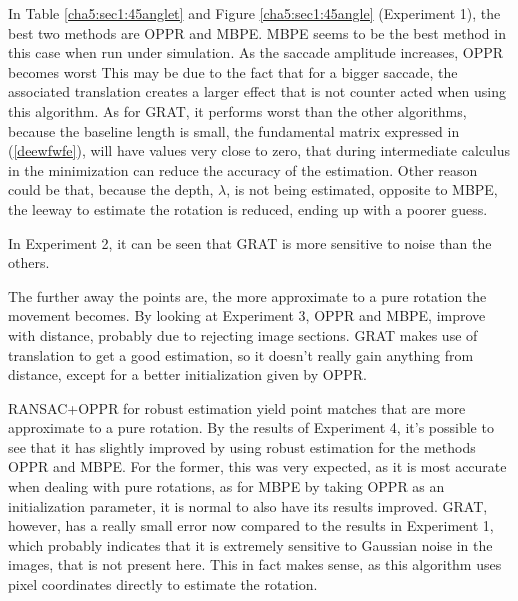 In Table \ref{cha5:sec1:45anglet} and Figure \ref{cha5:sec1:45angle} (Experiment 1), the best two methods are OPPR and MBPE. MBPE seems to be the best method in this case when run under simulation. As the saccade amplitude increases, OPPR becomes worst This may be due to the fact that for a bigger saccade, the associated translation creates a larger effect that is not counter acted when using this algorithm. As for GRAT, it performs worst than the other algorithms, because the baseline length is small, the fundamental matrix expressed in (\ref{deewfwfe}), will have values very close to zero, that during intermediate calculus in the minimization can reduce the accuracy of the estimation. Other reason could be that, because the depth, $\lambda$, is not being estimated, opposite to MBPE, the leeway to estimate the rotation is reduced, ending up with a poorer guess.

In Experiment 2, it can be seen that GRAT is more sensitive to noise than the others.

The further away the points are, the more approximate to a pure rotation the movement becomes. By looking at Experiment 3, OPPR and MBPE, improve with distance, probably due to rejecting image sections. GRAT makes use of translation to get a good estimation, so it doesn't really gain anything from distance, except for a better initialization given by OPPR.

RANSAC+OPPR for robust estimation yield point matches that are more approximate to a pure rotation. By the results of Experiment 4, it's possible to see that it has slightly improved by using robust estimation for the methods OPPR and MBPE. For the former, this was very expected, as it is most accurate when dealing with pure rotations, as for MBPE by taking OPPR as an initialization parameter, it is normal to also have its results improved. GRAT, however, has a really small error now compared to the results in Experiment 1, which probably indicates that it is extremely sensitive to Gaussian noise in the images, that is not present here. This in fact makes sense, as this algorithm uses pixel coordinates directly to estimate the rotation.

